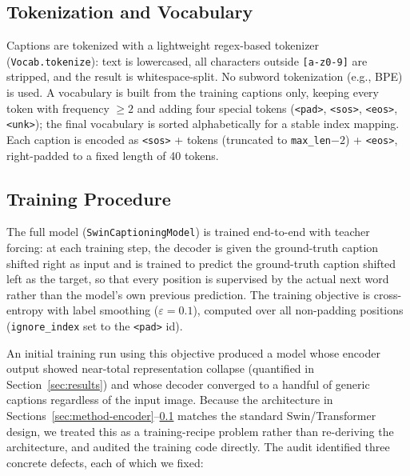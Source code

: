 \documentclass[conference]{IEEEtran}
\begin{document}
\subsection{Tokenization and Vocabulary}
\label{sec:method-vocab}

Captions are tokenized with a lightweight regex-based tokenizer (\texttt{Vocab.tokenize}): text is lowercased, all characters outside \texttt{[a-z0-9]} are stripped, and the result is whitespace-split. No subword tokenization (e.g., BPE) is used. A vocabulary is built from the training captions only, keeping every token with frequency $\ge 2$ and adding four special tokens (\texttt{<pad>}, \texttt{<sos>}, \texttt{<eos>}, \texttt{<unk>}); the final vocabulary is sorted alphabetically for a stable index mapping. Each caption is encoded as \texttt{<sos>} + tokens (truncated to \texttt{max\_len}$-2$) + \texttt{<eos>}, right-padded to a fixed length of 40 tokens.

\subsection{Training Procedure}
\label{sec:method-training}

The full model (\texttt{SwinCaptioningModel}) is trained end-to-end with teacher forcing: at each training step, the decoder is given the ground-truth caption shifted right as input and is trained to predict the ground-truth caption shifted left as the target, so that every position is supervised by the actual next word rather than the model's own previous prediction. The training objective is cross-entropy with label smoothing ($\varepsilon=0.1$), computed over all non-padding positions (\texttt{ignore\_index} set to the \texttt{<pad>} id).

An initial training run using this objective produced a model whose encoder output showed near-total representation collapse (quantified in Section~\ref{sec:results}) and whose decoder converged to a handful of generic captions regardless of the input image. Because the architecture in Sections~\ref{sec:method-encoder}--\ref{sec:method-vocab} matches the standard Swin/Transformer design, we treated this as a training-recipe problem rather than re-deriving the architecture, and audited the training code directly. The audit identified three concrete defects, each of which we fixed:
\end{document}

